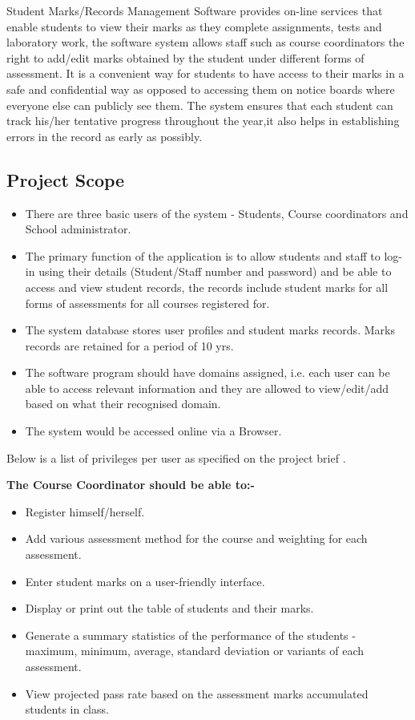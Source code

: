 \documentclass[10pt,onecolumn]{MainDocument}
\begin{document}
Student Marks/Records Management Software provides on-line services that enable students to view their marks as they complete  assignments, tests and laboratory work, the software system allows staff such as course coordinators the right to add/edit marks obtained by the student under different forms of assessment. It is a convenient way for students to have access to their marks in a safe and confidential way as opposed to accessing them on notice boards where everyone else can publicly see them. The system ensures that each student can track his/her tentative progress throughout the year,it also helps in establishing errors in the record as early as possibly. 

\subsection{Project Scope}
\begin{itemize}

\item There are three basic users of the system - Students, Course coordinators and School administrator.
\item The primary function of the application is to allow students and staff  to log-in using their details (Student/Staff number and password) and be able to access and view student records, the records include student marks for all forms of assessments for all courses registered for. 
\item The system database stores user profiles and student marks records. Marks records are retained for a period of 10 yrs.
\item The software program should have domains assigned, i.e. each user can be able to access relevant information and they are allowed to view/edit/add based on what their recognised domain.
\item  The system would be accessed online via a Browser.

\end{itemize}

Below is a list of privileges per user as specified on the project brief \cite{ref9}.

\textbf{The Course Coordinator should be able to:-}
\begin{itemize}
\item Register himself/herself.
\item Add various assessment method for the course and weighting for each assessment.
\item Enter student marks on a user-friendly interface.
\item Display or print out the table of students and their marks.
\item Generate a summary statistics of the performance of the students - maximum, minimum, average, standard deviation or variants of each assessment.  
\item View projected pass rate based on the assessment marks accumulated students in class.
\end{itemize}
\end{document}
